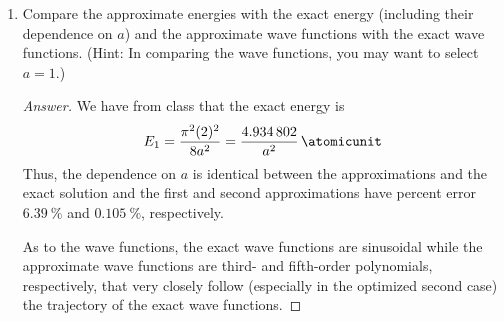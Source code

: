 \documentclass[../psets.tex]{subfiles}
\begin{document}
\begin{enumerate}
\begin{enumerate}
\begin{proof}[Answer]
\begin{align*}
\begin{vmatrix}
                \end{vmatrix}\\
                &= \left( \frac{4a^5}{5}-E\frac{16a^7}{105} \right) \left(  \frac{92a^9}{315}-E\frac{16a^{11}}{693}\right)-\left( \frac{12a^7}{35}-E\frac{16a^9}{315} \right)^2\\
                &= \frac{1024a^{18}}{1091475}E^2-\frac{2048a^{16}}{72765}E+\frac{256a^{14}}{2205}\\
                &= 4a^4E^2-120a^2E+495
            \end{align*}
            which we can do with the quadratic formula, getting
            \begin{align*}
                E &= \frac{30+9\sqrt{5}}{2a^2}&
                E &= \frac{30-9\sqrt{5}}{2a^2}
            \end{align*}
            It follows that the energy of the first excited state (the smaller of the two values above) is approximately
            \begin{equation*}
                \boxed{E = \frac{4.94}{a^2}\,\si{\atomicunit}}
            \end{equation*}
        \end{proof}
        \item Compare the approximate energies with the exact energy (including their dependence on $a$) and the approximate wave functions with the exact wave functions. (Hint: In comparing the wave functions, you may want to select $a=1$.)
        \begin{proof}[Answer]
            We have from class that the exact energy is
            \begin{equation*}
                E_1 = \frac{\pi^2(2)^2}{8a^2} = \frac{\num{4.934802}}{a^2}\,\si{\atomicunit}
            \end{equation*}
            Thus, the dependence on $a$ is identical between the approximations and the exact solution and the first and second approximations have percent error $\SI{6.39}{\percent}$ and $\SI{0.105}{\percent}$, respectively.\par
            As to the wave functions, the exact wave functions are sinusoidal while the approximate wave functions are third- and fifth-order polynomials, respectively, that very closely follow (especially in the optimized second case) the trajectory of the exact wave functions.

\end{proof}
\end{enumerate}
\end{enumerate}
\end{document}
